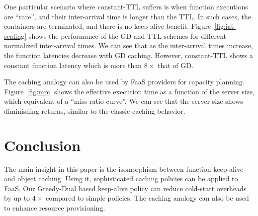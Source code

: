 

One particular scenario where constant-TTL suffers is when function executions are ``rare'', and their inter-arrival time is longer than the TTL.
In such cases, the containers are terminated, and there is no keep-alive benefit. 
Figure~\ref{fig:iat-scaling} shows the performance of the GD and TTL schemes for different normalized inter-arrival times. 
We can see that as the inter-arrival times increase, the function latencies decrease with GD caching.
However, constant-TTL shows a constant function latency which is more than $8\times$ that of GD.






The caching analogy can also be used by FaaS providers for capacity planning.
Figure~\ref{fig:mrc} shows the effective execution time as a function of the server size, which equivalent of a ``miss ratio curve''.
We can see that the server size shows diminishing returns, similar to the classic caching behavior. 


\vspace*{\subsecspace}
\section{Conclusion}
\vspace*{\subsecspace}

The main insight in this paper is the isomorphism between function keep-alive and object caching.
Using it, sophisticated caching policies can be applied to FaaS.
Our Greedy-Dual based keep-alive policy can reduce cold-start overheads by up to $4\times$ compared to simple policies.
The caching analogy can also be used to enhance resource provisioning. 

